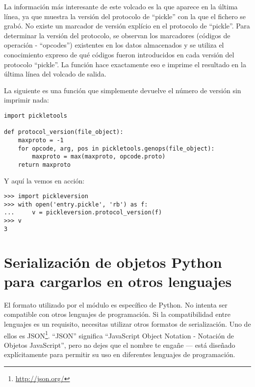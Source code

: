 La información más interesante de este volcado es la que aparece en la última línea, ya que muestra la versión del protocolo de ``pickle'' con la que el fichero se grabó. No existe un marcador de versión explício en el protocolo de ``pickle''. Para determinar la versión del protocolo, se observan los marcadores (códigos de operación - ``opcodes'') existentes en los datos almacenados y se utiliza el conocimiento expreso de qué códigos fueron introducidos en cada versión del protocolo ``pickle''. La función  hace exactamente eso e imprime el resultado en la última línea del volcado de salida.

La siguiente es una función que simplemente devuelve el número de versión sin imprimir nada:

\noindent\begin{minipage}{\textwidth}
\begin{lstlisting}[mathescape=True]
import pickletools

def protocol_version(file_object):
    maxproto = -1
    for opcode, arg, pos in pickletools.genops(file_object):
        maxproto = max(maxproto, opcode.proto)
    return maxproto
\end{lstlisting}
\end{minipage}

Y aquí la vemos en acción:

\noindent\begin{minipage}{\textwidth}
\begin{lstlisting}[mathescape=True]
>>> import pickleversion
>>> with open('entry.pickle', 'rb') as f:
...     v = pickleversion.protocol_version(f)
>>> v
3
\end{lstlisting}
\end{minipage}

\section{Serialización de objetos Python para cargarlos en otros lenguajes}

El formato utilizado por el módulo  es específico de Python. No intenta ser compatible con otros lenguajes de programación. Si la compatibilidad entre lenguajes es un requisito, necesitas utilizar otros formatos de serialización. Uno de ellos es JSON\footnote{\href{http://json.org/}{http://json.org/}}. ``JSON'' significa ``JavaScript Object Notation - Notación de Objetos JavaScript'', pero no dejes que el nombre te engañe --- está diseñado explícitamente para permitir su uso en diferentes lenguajes de programación.

